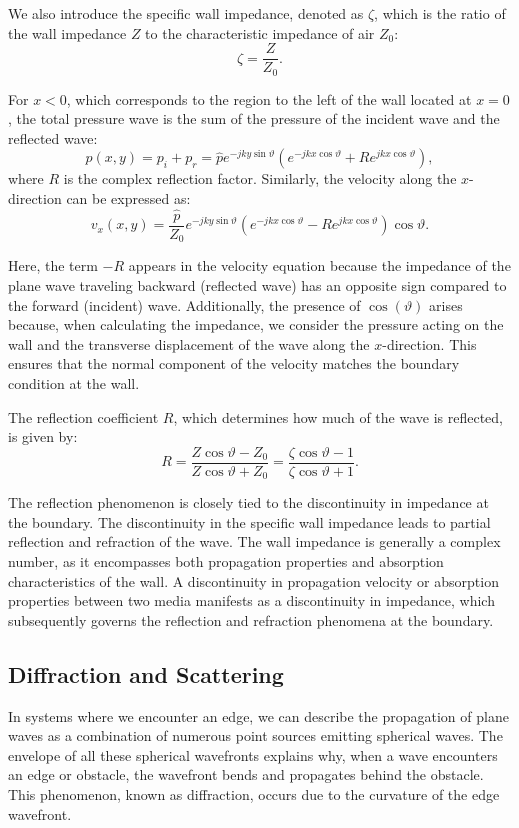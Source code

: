 \documentclass[a4paper]{article}
\begin{document}
We also introduce the specific wall impedance, denoted as \( \zeta \), which is the ratio of the wall impedance \( Z \) to the characteristic impedance of air \( Z_0 \):
\[
\zeta = \frac{Z}{Z_0}.
\]

For \( x < 0 \), which corresponds to the region to the left of the wall located at \( x = 0 \), the total pressure wave is the sum of the pressure of the incident wave and the reflected wave:
\[
p(x, y) = p_i + p_r = \hat{p} e^{-j k y \sin \vartheta} \left( e^{-j k x \cos \vartheta} + R e^{j k x \cos \vartheta} \right),
\]
where \( R \) is the complex reflection factor. Similarly, the velocity along the \( x \)-direction can be expressed as:
\[
v_x(x, y) = \frac{\hat{p}}{Z_0} e^{-j k y \sin \vartheta} \left( e^{-j k x \cos \vartheta} - R e^{j k x \cos \vartheta} \right) \cos \vartheta.
\]

Here, the term \( -R \) appears in the velocity equation because the impedance of the plane wave traveling backward (reflected wave) has an opposite sign compared to the forward (incident) wave. Additionally, the presence of \( \cos(\vartheta) \) arises because, when calculating the impedance, we consider the pressure acting on the wall and the transverse displacement of the wave along the \( x \)-direction. This ensures that the normal component of the velocity matches the boundary condition at the wall.

The reflection coefficient \( R \), which determines how much of the wave is reflected, is given by:
\[
R = \frac{Z \cos \vartheta - Z_0}{Z \cos \vartheta + Z_0} = \frac{\zeta \cos \vartheta - 1}{\zeta \cos \vartheta + 1}.
\]

The reflection phenomenon is closely tied to the discontinuity in impedance at the boundary. The discontinuity in the specific wall impedance leads to partial reflection and refraction of the wave. The wall impedance is generally a complex number, as it encompasses both propagation properties and absorption characteristics of the wall. A discontinuity in propagation velocity or absorption properties between two media manifests as a discontinuity in impedance, which subsequently governs the reflection and refraction phenomena at the boundary.

\subsection{Diffraction and Scattering}

In systems where we encounter an edge, we can describe the propagation of plane waves as a combination of numerous point sources emitting spherical waves. The envelope of all these spherical wavefronts explains why, when a wave encounters an edge or obstacle, the wavefront bends and propagates behind the obstacle. This phenomenon, known as diffraction, occurs due to the curvature of the edge wavefront. 
\end{document}
